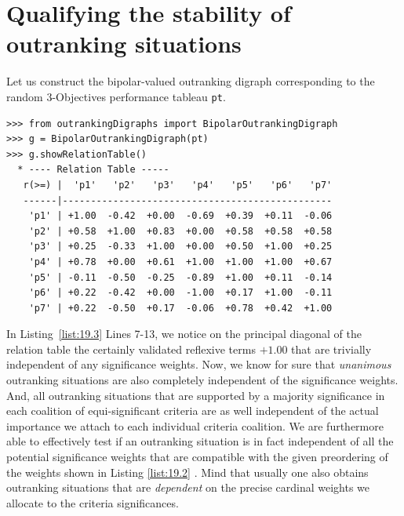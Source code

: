 \section{Qualifying the stability of outranking situations}
\label{sec:19.2}

Let us construct the bipolar-valued outranking digraph corresponding to the random 3-Objectives performance tableau \texttt{pt}.
\begin{lstlisting}[caption={Example Bipolar Outranking Digraph},label=list:19.3]
>>> from outrankingDigraphs import BipolarOutrankingDigraph
>>> g = BipolarOutrankingDigraph(pt)
>>> g.showRelationTable()
  * ---- Relation Table -----
   r(>=) |  'p1'   'p2'   'p3'   'p4'   'p5'   'p6'   'p7'   
   ------|------------------------------------------------
    'p1' | +1.00  -0.42  +0.00  -0.69  +0.39  +0.11  -0.06  
    'p2' | +0.58  +1.00  +0.83  +0.00  +0.58  +0.58  +0.58  
    'p3' | +0.25  -0.33  +1.00  +0.00  +0.50  +1.00  +0.25  
    'p4' | +0.78  +0.00  +0.61  +1.00  +1.00  +1.00  +0.67  
    'p5' | -0.11  -0.50  -0.25  -0.89  +1.00  +0.11  -0.14  
    'p6' | +0.22  -0.42  +0.00  -1.00  +0.17  +1.00  -0.11  
    'p7' | +0.22  -0.50  +0.17  -0.06  +0.78  +0.42  +1.00  
\end{lstlisting}
In Listing~\ref{list:19.3} Lines 7-13, we notice on the principal diagonal of the relation table the certainly validated reflexive terms $+1.00$ that are trivially independent of any significance weights. Now, we know for sure that \emph{unanimous} outranking situations are also completely independent of the significance weights. And, all outranking situations that are supported by a majority significance in each coalition of equi-significant criteria are as well independent of the actual importance we attach to each individual criteria coalition. We are furthermore able to effectively test if an outranking situation is in fact independent of all the potential significance weights that are compatible with the given preordering of the weights shown in Listing \ref{list:19.2} \citep{BIS-2014}. Mind that usually one also obtains outranking situations that are \emph{dependent} on the precise cardinal weights we allocate to the criteria significances.

